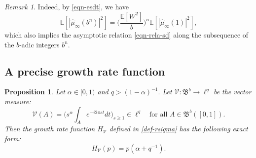 \documentclass[12pt]{amsart}
\newtheorem{proposition}[theorem]{Proposition}
\theoremstyle{definition}
\theoremstyle{remark}
\newtheorem*{remark*}{Remark}
\newcommand{\E}{\mathbb{E}}
\numberwithin{equation}{section}
\begin{document}
\begin{remark*}
Indeed, by \eqref{eqn-esdt}, we have
\[
\E[|\widehat{\mu}_\infty(b^n)|^2]=\big(\frac{\E[W^2]}{b}\big)^n\E[|\widehat{\mu}_\infty(1)|^2],
\]
which also implies the asymptotic relation \eqref{eqn-rela-sd} along the subsequence of the $b$-adic integers $b^n$.
\end{remark*}



\subsection{A precise growth rate function}


\begin{proposition}\label{lem-grf}
Let  $\alpha \in [0,1)$ and  
$
q>   (1-\alpha)^{-1}.
$  Let  $\mathcal{V}: \mathfrak{B}^b \rightarrow \ell^q$ be the vector measure:
\[
\mathcal{V}(A) =   \Big( s^\alpha \int_{A}e^{-i 2\pi st} dt \Big)_{s\ge 1} \in \ell^q \quad \text{for all $A\in \mathfrak{B}^b([0,1])$}.
\]
Then the growth rate function $H_\mathcal{V}$ defined in \eqref{def-rsigma} has the following exact form: 
\[
H_{\mathcal{V}}(p) =    p (  \alpha + q^{-1}). 
\]
\end{proposition}
\end{document}
